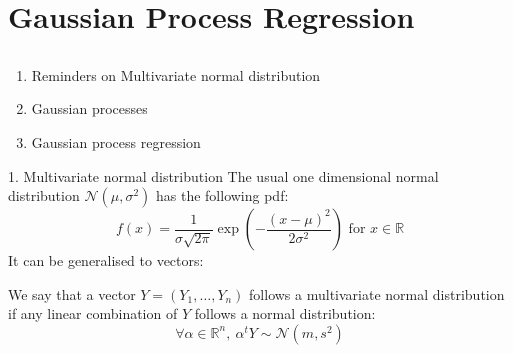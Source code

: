 \section[Gaussian Process regression]{Gaussian Process Regression}
\subsection{}
\begin{frame}{}
\vspace{0.75cm}
\vspace{0.5cm}
\begin{enumerate}
    \item Reminders on Multivariate normal distribution
    \item Gaussian processes
    \item Gaussian process regression
\end{enumerate}
\end{frame}


\begin{frame}{1. Multivariate normal distribution}
The usual one dimensional normal distribution $\mathcal{N}(\mu,\sigma^2)$ has the following pdf:
\begin{equation*}
f(x) = \frac{1}{\sigma \sqrt{2 \pi}} \exp \left(-\frac{(x-\mu)^2}{2 \sigma^2} \right) \text{ for } x \in \mathds{R}
\end{equation*}
It can be generalised to vectors:
\begin{definition}
	We say that a vector $Y=(Y_1, \dots, Y_n)$ follows a multivariate normal distribution if any linear combination of $Y$ follows a normal distribution:
	\begin{equation*}
		\forall \alpha \in \mathds{R}^n,\ \alpha^t Y \sim \mathcal{N}(m,s^2)
	\end{equation*}
\end{definition}
\end{frame}

